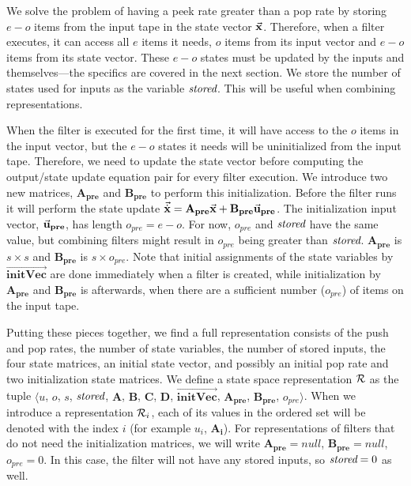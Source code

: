 We solve the problem of having a peek rate greater than a pop
rate by storing $e-o$ items from the input tape in the state
vector $\vec{\mathbf{x}}$. Therefore, when a filter executes, it
can access all $e$ items it needs, $o$ items from its input vector
and $e-o$ items from its state vector. These $e-o$ states must be
updated by the inputs and themselves---the specifics are covered
in the next section. We store the number of states used for inputs
as the variable $\mbox{\it stored}$. This will be useful when combining
representations.

When the filter is executed for the first time, it will have access to
the $o$ items in the input vector, but the $e-o$ states it needs will
be uninitialized from the input tape. Therefore, we need to update the
state vector before computing the output/state update equation pair
for every filter execution. We introduce two new matrices,
$\mathbf{A_{pre}}$ and $\mathbf{B_{pre}}$ to perform this
initialization. Before the filter runs it will perform the state
update $\vec{\dot{\mathbf{x}}} =
\mathbf{A_{pre}}\vec{\mathbf{x}} +
\mathbf{B_{pre}}{\vec{\mathbf{u}}}_{\mathbf{pre}}$. The initialization input
vector, ${\vec{\mathbf{u}}}_{\mathbf{pre}}$, has length $o_{pre} = e-o$. For
now, $o_{pre}$ and $\mbox{\it stored}$ have the same value, but combining
filters might result in $o_{pre}$ being greater than $\mbox{\it stored}$.
$\mathbf{A_{pre}}$ is $s \times s$ and $\mathbf{B_{pre}}$ is $s
\times o_{pre}$. Note that initial assignments of the state
variables by $\overrightarrow{\mathbf{initVec}}$ are done
immediately when a filter is created, while initialization by
$\mathbf{A_{pre}}$ and $\mathbf{B_{pre}}$ is afterwards, when
there are a sufficient number ($o_{pre}$) of items on the input
tape.

Putting these pieces together, we find a full representation consists
of the push and pop rates, the number of state variables, the number
of stored inputs, the four state matrices, an initial state vector,
and possibly an initial pop rate and two initialization state
matrices. We define a state space representation $\cal{R}$ as the
tuple $\langle$$u$, $o$, $s$, $\mbox{\it stored}$, $\mathbf{A}$, $\mathbf{B}$,
$\mathbf{C}$, $\mathbf{D}$, $\overrightarrow{\mathbf{initVec}}$,
$\mathbf{A_{pre}}$, $\mathbf{B_{pre}}$, $o_{pre}$$\rangle$. When we
introduce a representation ${\cal R}_i$, each of its values in the
ordered set will be denoted with the index $i$ (for example $u_i$,
$\mathbf{A_i}$). For representations of filters that do not need the
initialization matrices, we will write $\mathbf{A_{pre}} = null$,
$\mathbf{B_{pre}} = null$, $o_{pre} = 0$. In this case, the filter
will not have any stored inputs, so $\mbox{\it stored} = 0$ as well.

